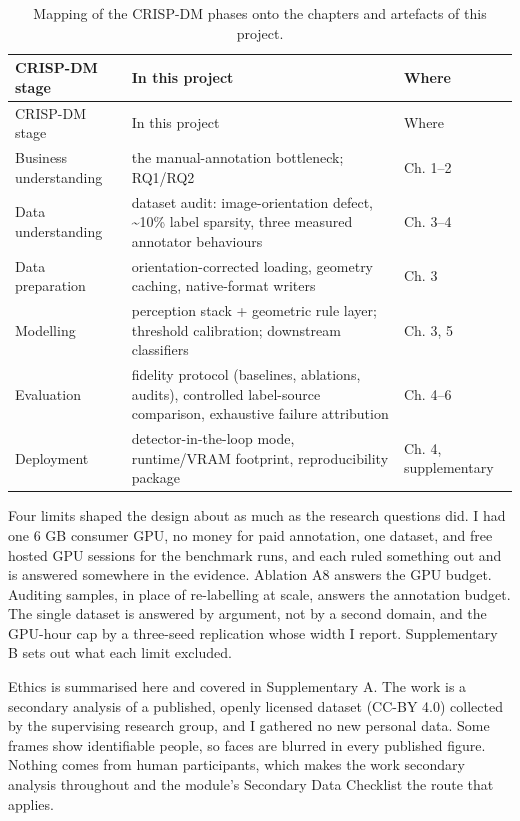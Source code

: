 \begin{center}
\setlength{\tabcolsep}{3pt}
\footnotesize
\begin{longtable}{>{\raggedright\arraybackslash}p{}>{\raggedright\arraybackslash}p{}>{\raggedright\arraybackslash}p{}}
\caption[Mapping of the CRISP-DM phases onto the chapters]{Mapping of the CRISP-DM phases onto the chapters and artefacts of this project.}\\
\hline
CRISP-DM stage & In this project & Where \\
\hline
\endfirsthead
\hline
CRISP-DM stage & In this project & Where \\
\hline
\endhead
Business understanding & the manual-annotation bottleneck; RQ1/RQ2 & Ch. 1--2 \\
Data understanding & dataset audit: image-orientation defect, \textasciitilde{}10\% label sparsity, three measured annotator behaviours & Ch. 3--4 \\
Data preparation & orientation-corrected loading, geometry caching, native-format writers & Ch. 3 \\
Modelling & perception stack + geometric rule layer; threshold calibration; downstream classifiers & Ch. 3, 5 \\
Evaluation & fidelity protocol (baselines, ablations, audits), controlled label-source comparison, exhaustive failure attribution & Ch. 4--6 \\
Deployment & detector-in-the-loop mode, runtime/VRAM footprint, reproducibility package & Ch. 4, supplementary \\
\hline
\end{longtable}
\end{center}

Four limits shaped the design about as much as the research questions did. I had one 6 GB consumer GPU, no money for paid annotation, one dataset, and free hosted GPU sessions for the benchmark runs, and each ruled something out and is answered somewhere in the evidence. Ablation A8 answers the GPU budget. Auditing samples, in place of re-labelling at scale, answers the annotation budget. The single dataset is answered by argument, not by a second domain, and the GPU-hour cap by a three-seed replication whose width I report. Supplementary B sets out what each limit excluded.

Ethics is summarised here and covered in Supplementary A. The work is a secondary analysis of a published, openly licensed dataset (CC-BY 4.0) collected by the supervising research group, and I gathered no new personal data. Some frames show identifiable people, so faces are blurred in every published figure. Nothing comes from human participants, which makes the work secondary analysis throughout and the module's Secondary Data Checklist the route that applies.

